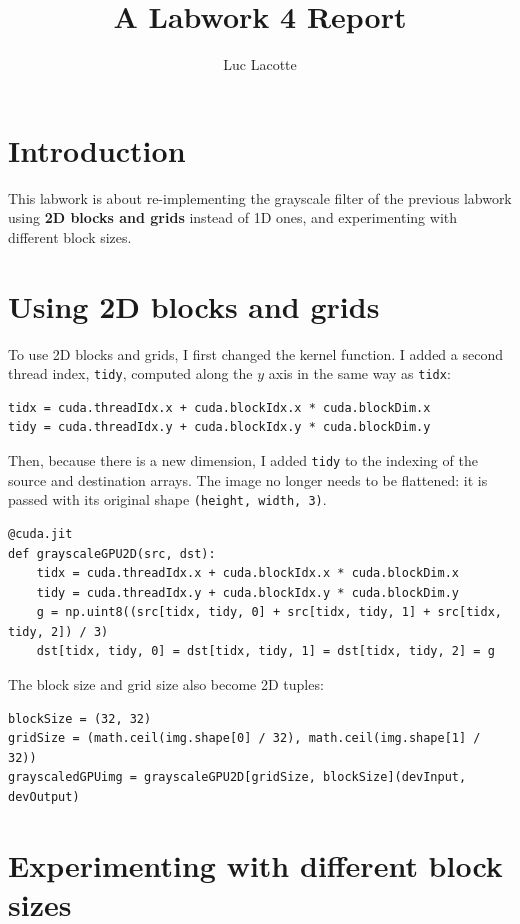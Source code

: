 \documentclass{report}
\title{A Labwork 4 Report}
\author{Luc Lacotte}
\date{}
\begin{document}
\maketitle

\section{Introduction}
This labwork is about re-implementing the grayscale filter of the previous labwork using \textbf{2D blocks and grids} instead of 1D ones, and experimenting with different block sizes.

\section{Using 2D blocks and grids}
To use 2D blocks and grids, I first changed the kernel function. I added a second thread index, \texttt{tidy}, computed along the $y$ axis in the same way as \texttt{tidx}:

\begin{lstlisting}
tidx = cuda.threadIdx.x + cuda.blockIdx.x * cuda.blockDim.x
tidy = cuda.threadIdx.y + cuda.blockIdx.y * cuda.blockDim.y
\end{lstlisting}

Then, because there is a new dimension, I added \texttt{tidy} to the indexing of the source and destination arrays. The image no longer needs to be flattened: it is passed with its original shape \texttt{(height, width, 3)}.

\begin{lstlisting}
@cuda.jit
def grayscaleGPU2D(src, dst):
    tidx = cuda.threadIdx.x + cuda.blockIdx.x * cuda.blockDim.x
    tidy = cuda.threadIdx.y + cuda.blockIdx.y * cuda.blockDim.y
    g = np.uint8((src[tidx, tidy, 0] + src[tidx, tidy, 1] + src[tidx, tidy, 2]) / 3)
    dst[tidx, tidy, 0] = dst[tidx, tidy, 1] = dst[tidx, tidy, 2] = g
\end{lstlisting}

The block size and grid size also become 2D tuples:

\begin{lstlisting}
blockSize = (32, 32)
gridSize = (math.ceil(img.shape[0] / 32), math.ceil(img.shape[1] / 32))
grayscaledGPUimg = grayscaleGPU2D[gridSize, blockSize](devInput, devOutput)
\end{lstlisting}

\section{Experimenting with different block sizes}
\end{document}
